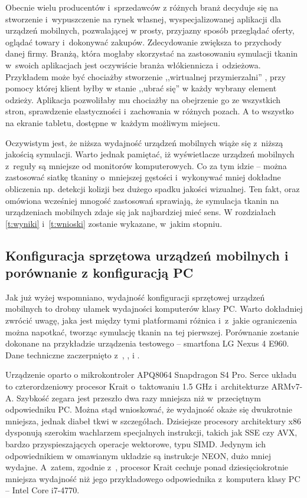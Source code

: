 		Obecnie wielu producentów i~sprzedawców z różnych branż decyduje się na stworzenie i~wypuszczenie na rynek własnej, wyspecjalizowanej aplikacji dla urządzeń mobilnych, pozwalającej w prosty, przyjazny sposób przeglądać oferty, oglądać towary i~dokonywać zakupów. Zdecydowanie zwiększa to przychody danej firmy. Branżą, która mogłaby skorzystać na zastosowaniu symulacji tkanin w~swoich aplikacjach jest oczywiście branża włókiennicza i~odzieżowa. Przykładem może być chociażby stworzenie ,,wirtualnej przymierzalni'' \cite{tryon}, przy pomocy której klient byłby w stanie ,,ubrać się'' w każdy wybrany element odzieży. Aplikacja pozwoliłaby mu chociażby na obejrzenie go ze wszystkich stron, sprawdzenie elastyczności i~zachowania w różnych pozach. A to wszystko na ekranie tabletu, dostępne w~każdym możliwym miejscu. 
		
		Oczywistym jest, że niższa wydajność urządzeń mobilnych wiąże się z~niższą jakością symulacji. Warto jednak pamiętać, iż wyświetlacze urządzeń mobilnych z~reguły są mniejsze od monitorów komputerowych. Co za tym idzie -- można zastosować siatkę tkaniny o~mniejszej gęstości i~wykonywać mniej dokładne obliczenia np. detekcji kolizji bez dużego spadku jakości wizualnej. Ten fakt, oraz omówiona wcześniej mnogość zastosowań sprawiają, że symulacja tkanin na urządzeniach mobilnych zdaje się jak najbardziej mieć sens. W rozdziałach \ref{t:wyniki} i~\ref{t:wnioski} zostanie wykazane, w~jakim stopniu.
	
		\subsection{Konfiguracja sprzętowa urządzeń mobilnych i porównanie z konfiguracją PC}
		\label{t:technologie:mobilne:konfiguracja}
		
		
		Jak już wyżej wspomniano, wydajność konfiguracji sprzętowej urządzeń mobilnych to drobny ułamek wydajności komputerów klasy PC. Warto dokładniej zwrócić uwagę, jaka jest między tymi platformami różnica i~z~jakie ograniczenia można napotkać, tworząc symulację tkanin na tej pierwszej. Porównanie zostanie dokonane na przykładzie urządzenia testowego -- smartfona LG Nexus 4 E960. Dane techniczne zaczerpnięto z~\cite{specs}, \cite{specs_adreno}, \cite{specs_gtx750} i \cite{specs_gtxtitan}. 
		
		Urządzenie oparto o mikrokontroler APQ8064 Snapdragon S4 Pro. Serce układu to czterordzeniowy procesor Krait o~taktowaniu 1.5 GHz i~architekturze ARMv7-A. Szybkość zegara jest przeszło dwa razy mniejsza niż w~przeciętnym odpowiedniku PC. Można stąd wnioskować, że wydajność okaże się dwukrotnie mniejsza, jednak diabeł tkwi w szczegółach. Dzisiejsze procesory architektury x86 dysponują szerokim wachlarzem specjalnych instrukcji, takich jak SSE czy AVX, bardzo przyspieszających operacje wektorowe, typu SIMD. Jedynym ich odpowiednikiem w omawianym układzie są instrukcje NEON, dużo mniej wydajne. A~zatem, zgodnie z~\cite{versus}, procesor Krait cechuje ponad dziesięciokrotnie mniejsza wydajność niż jego przykładowego odpowiednika z~komputera klasy PC -- Intel Core i7-4770.
		
